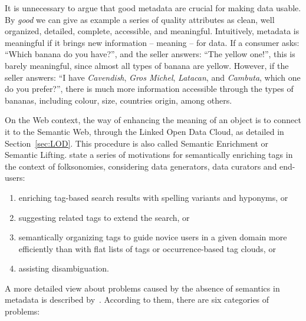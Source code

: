 It is unnecessary to argue that good metadata are crucial for making data usable.
By \emph{good} we can give as example a series of quality attributes as clean, well organized, detailed, complete, accessible, and meaningful.
Intuitively, metadata is meaningful if it brings new information -- meaning -- for data.
If a consumer asks: ``Which banana do you have?'', and the seller answers: ``The yellow one!'', this is barely meaningful, since almost all types of banana are yellow.
However, if the seller answers: ``I have \emph{Cavendish}, \emph{Gros Michel}, \emph{Latacan}, and \emph{Cambuta}, which one do you prefer?'', there is much more information accessible through the types of bananas, including colour, size, countries origin, among others.

On the Web context, the way of enhancing the meaning of an object is to connect it to the Semantic Web, through the Linked Open Data Cloud, as detailed in Section~\ref{sec:LOD}.
This procedure is also called Semantic Enrichment or Semantic Lifting.
 state a series of motivations for semantically enriching tags in the context of folksonomies, considering data generators, data curators and end-users:
\begin{enumerate}
	\item enriching tag-based search results with spelling variants and hyponyms, or 
	\item suggesting related tags to extend the search, or 
	\item semantically organizing tags to guide novice users in a given domain more efficiently than with flat lists of tags or occurrence-based tag clouds, or 
	\item assisting disambiguation.
\end{enumerate}

A more detailed view about problems caused by the absence of semantics in metadata is described by~.
According to them, there are six categories of problems:

